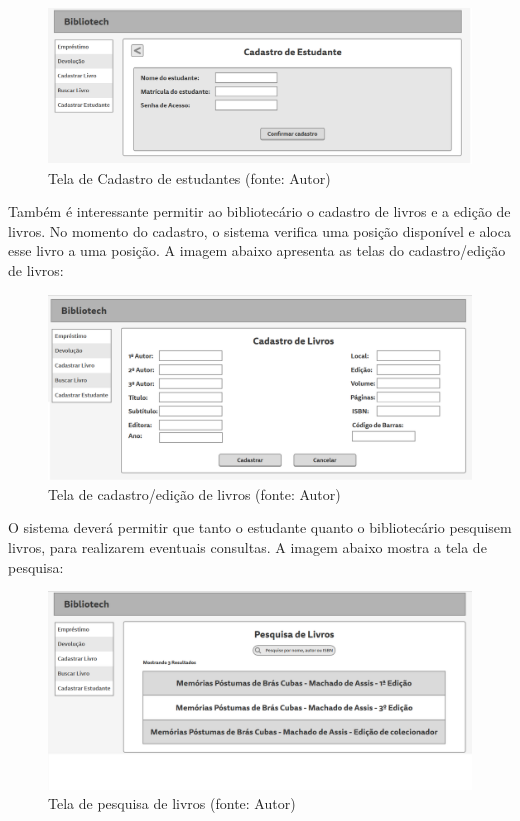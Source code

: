 \begin{figure}[!h]
\centering
\includegraphics[scale=0.40, angle = 360]{figuras/prototipo3}
\caption[]{Tela de Cadastro de estudantes (fonte: Autor)}
\end{figure}
\FloatBarrier

Também é interessante permitir ao bibliotecário o cadastro de livros e a edição de livros. No momento do cadastro, o sistema verifica uma posição disponível e aloca esse livro a uma posição. A imagem abaixo apresenta as telas do cadastro/edição de livros:

\begin{figure}[!h]
\centering
\includegraphics[scale=0.40, angle = 360]{figuras/prototipo4}
\caption[]{Tela de cadastro/edição de livros (fonte: Autor)}
\end{figure}
\FloatBarrier

O sistema deverá permitir que tanto o estudante quanto o bibliotecário pesquisem livros, para realizarem eventuais consultas. A imagem abaixo mostra a tela de pesquisa:

\begin{figure}[!h]
\centering
\includegraphics[scale=0.40, angle = 360]{figuras/prototipo5}
\caption[]{Tela de pesquisa de livros (fonte: Autor)}
\end{figure}
\FloatBarrier

